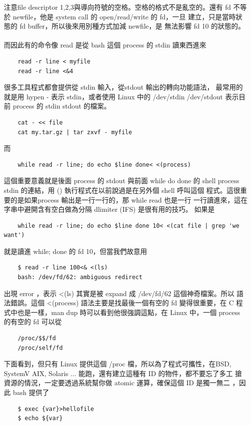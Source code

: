     注意file descriptor 1,2,3與導向符號的空格。空格的格式不是亂空的。還有
    fd 不等於 newfile，他是 system call 的 open/read/write 的 fd，一旦
    建立，只是當時狀態的 fd buffer，所以後來用別種方式加減 newfile，是
    無法影響 fd 10 的狀態的。
    \\\\
    而因此有的命令像 read 是從 bash 這個 process 的 stdin 讀東西進來
    \begin{verbatim}
    read -r line < myfile
    read -r line <&4
    \end{verbatim}
    很多工具程式都會提供從 stdin 輸入，從stdout 輸出的轉向功能語法，
    最常用的就是用 hypen - 表示 stdin，或者使用 Linux 中的 /dev/stdin
    /dev/stdout 表示目前 process 的 stdin stdout 的檔案。
    \begin{verbatim}
    cat - << file
    cat my.tar.gz | tar zxvf - myfile
    \end{verbatim}
    而
    \begin{verbatim}
    while read -r line; do echo $line done< <(process)
    \end{verbatim}
    這個重要意義就是後面 process 的 stdout 與前面 while do done 的 shell
    process stdin 的連結，用 () 執行程式在以前說過是在另外個 shell 呼叫這個
    程式。這很重要的是如果process 輸出是一行一行的，那 while read 也是一行
    一行讀進來，這在字串中避開含有空白做為分隔 dlimiter (IFS) 是很有用的技巧。
    如果是
    \begin{verbatim}
    while read -r line; do echo $line done 10< <(cat file | grep 'we want')
    \end{verbatim}
    就是讀進 while; done 的 fd 10，但當我們故意用
    \begin{verbatim}
    $ read -r line 100<& <(ls)
    bash: /dev/fd/62: ambiguous redirect
    \end{verbatim}
    出現 error ，表示 <(ls) 其實是被 expand 成 /dev/fd/62 這個神奇檔案。所以
    語法錯誤。這個 <(process) 語法主要是找最後一個有空的 fd 變得很重要，在 C
    程式中也是一樣，man dup 時可以看到他很強調這點，在 Linux 中，一個
    process 的有空的 fd 可以從
    \begin{verbatim}
    /proc/$$/fd
    /proc/self/fd
    \end{verbatim}
    下面看到，但只有 Linux 提供這個 /proc 檔，所以為了程式可攜性，在BSD, 
    SystemV AIX, Solaris ... 能跑，還有建立這種有 ID 的物件，都不要忘了多工
    搶資源的情況，一定要透過系統幫你做 atomic 運算，確保這個 ID 是獨一無二
    ，因此 bash 提供了
    \begin{verbatim}
    $ exec {var}>hellofile
    $ echo ${var}
    \end{verbatim}
